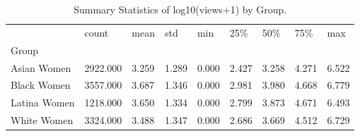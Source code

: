 \begin{table}[htbp]
\centering
\caption{Summary Statistics of log10(views+1) by Group.}
\label{tab:eda_views_stats}
\begin{tabular}{lllllllll}
\toprule
 & count & mean & std & min & 25\% & 50\% & 75\% & max \\
Group &  &  &  &  &  &  &  &  \\
\midrule
Asian Women & 2922.000 & 3.259 & 1.289 & 0.000 & 2.427 & 3.258 & 4.271 & 6.522 \\
Black Women & 3557.000 & 3.687 & 1.346 & 0.000 & 2.981 & 3.980 & 4.668 & 6.779 \\
Latina Women & 1218.000 & 3.650 & 1.334 & 0.000 & 2.799 & 3.873 & 4.671 & 6.493 \\
White Women & 3324.000 & 3.488 & 1.347 & 0.000 & 2.686 & 3.669 & 4.512 & 6.729 \\
\bottomrule
\end{tabular}

\end{table}